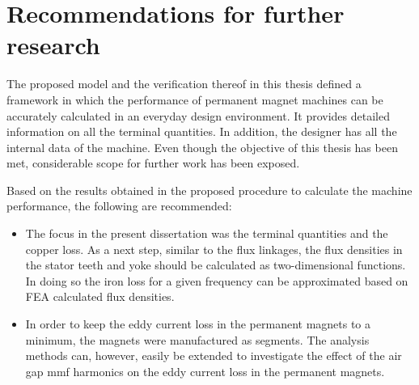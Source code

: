 \section{Recommendations for further research}
The proposed model and the verification thereof in this thesis defined a framework in which the performance of permanent magnet machines can be accurately calculated in an everyday design environment. It provides detailed information on all the terminal quantities. In addition, the designer has all the internal data of the machine. Even though the objective of this thesis has been met, considerable scope for further work has been exposed. 

Based on the results obtained in the proposed procedure to calculate the machine performance, the following are recommended:
\begin{itemize}
	\item The focus in the present dissertation was the terminal quantities and the copper loss. As a next step, similar to the flux linkages, the flux densities in the stator teeth and yoke should be calculated as two-dimensional functions. In doing so the iron loss for a given frequency can be approximated based on FEA calculated flux densities.
	\item In order to keep the eddy current loss in the permanent magnets to a minimum, the magnets were manufactured as segments. The analysis methods can, however, easily be extended to investigate the effect of the air gap mmf harmonics on the eddy current loss in the permanent magnets. 
\end{itemize}

\endinput